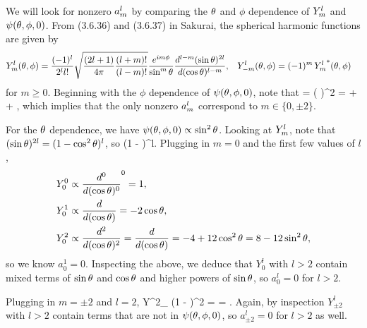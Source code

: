 \begin{solution}
	We will look for nonzero $a^l_m$ by comparing the $\theta$ and $\phi$ dependence of $Y^l_m$ and $\psi(\theta, \phi, 0)$.  From (3.6.36) and (3.6.37) in Sakurai, the spherical harmonic functions are given by
	\begin{align*}
		Y^l_m(\theta, \phi) &= \frac{(-1)^l}{2^l l!} \sqrt{\frac{(2l + 1)}{4\pi} \frac{(l + m)!}{(l - m)!}} \frac{e^{i m \phi}}{\sin^m{\theta}} \dv[l - m]{(\sin{\theta})^{2l}}{(\cos{\theta})}, &
		Y^l_{-m}(\theta, \phi) &= (-1)^m \, {Y^l_m}^*(\theta, \phi)
	\end{align*}
	for $m \geq 0$.  Beginning with the $\phi$ dependence of $\psi(\theta, \phi, 0)$, note that
	\beqn \label{cos}
		\psitpo \propto \coswp = \left(  \right)^2 =  +  + ,
	\eeqn
	which implies that the only nonzero $a^l_m$ correspond to $m \in \{ 0, \pm 2 \}$.
	
	For the $\theta$ dependence, we have $\psi(\theta, \phi, 0) \propto \sin^2{\theta}$.  Looking at $Y^l_m$, note that $(\sin{\theta})^{2l} = (1 - \cos^2{\theta})^l$, so
	\beq
		\Ylm \propto {} \dv[l - m]{}{(\cost)} (1 - \coswt)^l.
	\eeq
	Plugging in $m = 0$ and the first few values of $l$,
	\begin{align*}
		Y^0_0 &\propto \dv[0]{}{(\cos{\theta})} (1 - \cos^2{\theta})^0 = 1, \\
		Y^1_0 &\propto \dv{}{(\cos{\theta})} (1 - \cos^2{\theta}) = -2\cos{\theta}, \\
		Y^2_0 &\propto \dv[2]{}{(\cos{\theta})} (1 - 2\cos^2{\theta} + \cos^4{\theta}) = \dv{}{(\cos{\theta})} (-4 \cos{\theta} + 4 \cos^3{\theta}) = -4 + 12 \cos^2{\theta} = 8 - 12 \sin^2{\theta},
	\end{align*}
	so we know $a^1_0 = 0$.  Inspecting the above, we deduce that $Y^l_0$ with $l > 2$ contain mixed terms of $\sin{\theta}$ and $\cos{\theta}$ and higher powers of $\sin{\theta}$, so $a^l_0 = 0$ for $l > 2$.
	
	Plugging in $m = \pm 2$ and $l = 2$,
	\beq
		Y^2_{} \propto {} \dv[0]{}{(\cost)} (1 - \coswt)^2 =  = \sinwt.
	\eeq
	Again, by inspection $Y^l_{\pm2}$ with $l > 2$ contain terms that are not in $\psi(\theta, \phi, 0)$, so $a^l_{\pm2} = 0$ for $l > 2$ as well.
	

\end{solution}
